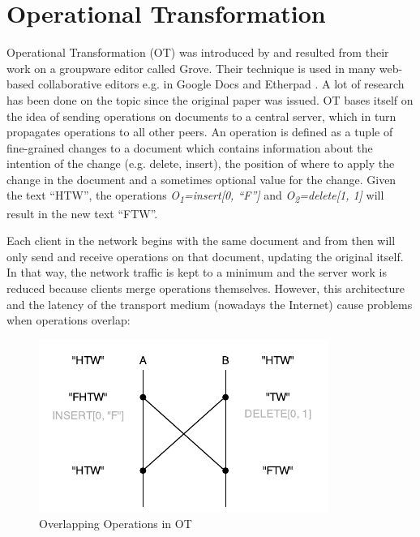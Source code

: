 \section{Operational Transformation}
\label{sync-ot}

Operational Transformation (OT) was introduced by \cite{ellis89groupware} and resulted from their work on a groupware editor called Grove. Their technique is used in many web-based collaborative editors e.g. in Google Docs and Etherpad \cite{lautamaki2012cored}. A lot of research has been done on the topic since the original paper was issued. OT bases itself on the idea of sending operations on documents to a central server, which in turn propagates operations to all other peers. An operation is defined as a tuple of fine-grained changes to a document which contains information about the intention of the change (e.g. delete, insert), the position of where to apply the change in the document and a sometimes optional value for the change. Given the text ``HTW'', the operations \emph{O\textsubscript{1}=insert[0, ``F'']} and \emph{O\textsubscript{2}=delete[1, 1]} will result in the new text ``FTW''.

Each client in the network begins with the same document and from then will only send and receive operations on that document, updating the original itself. In that way, the network traffic is kept to a minimum and the server work is reduced because clients merge operations themselves. However, this architecture and the latency of the transport medium (nowadays the Internet) cause problems when operations overlap:

\begin{figure}[htb]
  \centerline{\includegraphics[width=0.8\linewidth]{images/Operational_Transformation.pdf}}
  \caption[Overlapping Operations in OT - based upon
  \protect{}]{Overlapping Operations in OT}
  \label{fig:OT}
\end{figure}


